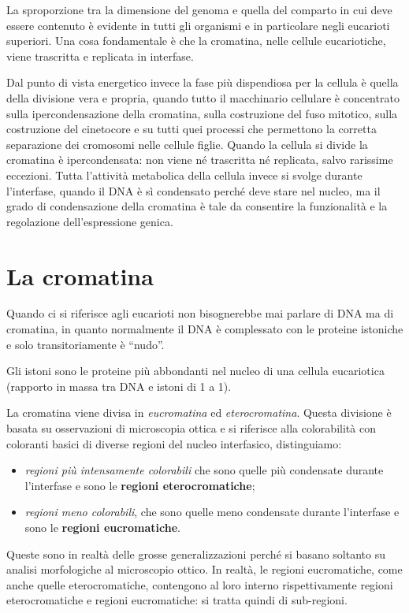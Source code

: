 \documentclass[11pt]{book}
\begin{document}
La sproporzione tra la dimensione del genoma e quella del comparto in cui deve essere contenuto è evidente in tutti gli organismi e in particolare negli eucarioti superiori.
Una cosa fondamentale è che la cromatina, nelle cellule eucariotiche, viene trascritta e replicata in interfase.

Dal punto di vista energetico invece la fase più dispendiosa per la cellula è quella della divisione vera e propria, quando tutto il macchinario cellulare è concentrato sulla ipercondensazione della cromatina, sulla costruzione del fuso mitotico, sulla costruzione del cinetocore e su tutti quei processi che permettono la corretta separazione dei cromosomi nelle cellule figlie. Quando la cellula si divide la cromatina è ipercondensata: non viene né trascritta né replicata, salvo rarissime eccezioni.
Tutta l’attività metabolica della cellula invece si svolge durante l’interfase, quando il DNA è sì condensato perché deve stare nel nucleo, ma il grado di condensazione della cromatina è tale da consentire la funzionalità e la regolazione dell’espressione genica. 


\section{La cromatina}
Quando ci si riferisce agli eucarioti non bisognerebbe mai parlare di DNA ma di cromatina, in quanto normalmente il DNA è complessato con le proteine istoniche e solo transitoriamente è ``nudo''.

Gli istoni sono le proteine più abbondanti nel nucleo di una cellula eucariotica (rapporto in massa tra DNA e istoni di 1 a 1).

La cromatina viene divisa in \emph{eucromatina} ed \emph{eterocromatina}. Questa divisione è basata su osservazioni di microscopia ottica e si riferisce alla colorabilità con coloranti basici di diverse regioni del nucleo interfasico, distinguiamo:
\begin{itemize}
\item \emph{regioni più intensamente colorabili} che sono quelle più condensate durante l’interfase e sono le \textbf{regioni eterocromatiche}; 
\item \emph{regioni meno colorabili}, che sono quelle meno condensate durante l'interfase e sono le \textbf{regioni eucromatiche}.
\end{itemize}

Queste sono in realtà delle grosse generalizzazioni perché si basano soltanto su analisi morfologiche al microscopio ottico. In realtà, le regioni eucromatiche, come anche quelle eterocromatiche, contengono al loro interno rispettivamente regioni eterocromatiche e regioni eucromatiche: si tratta quindi di sub-regioni.
\end{document}
